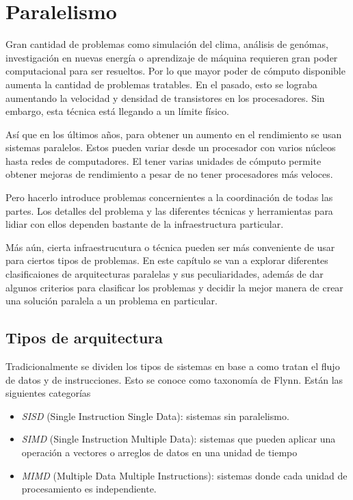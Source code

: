 \chapter{Paralelismo}

Gran cantidad de problemas como simulación del clima, análisis de genómas,
investigación en nuevas energía o aprendizaje de máquina \cite{Pacheco2011}
requieren gran poder computacional para ser resueltos. Por lo que mayor poder
de cómputo disponible aumenta la cantidad de problemas tratables. En el pasado,
esto se lograba aumentando la velocidad y densidad de transistores en los
procesadores. Sin embargo, esta técnica está llegando a un límite físico.

Así que en los últimos años, para obtener un aumento en el rendimiento se usan
sistemas paralelos. Estos pueden variar desde un procesador con varios núcleos
hasta redes de computadores. El tener varias unidades de cómputo permite obtener
mejoras de rendimiento a pesar de no tener procesadores más veloces.

Pero hacerlo introduce problemas concernientes a la coordinación de todas las
partes. Los detalles del problema y las diferentes técnicas y herramientas para
lidiar con ellos dependen bastante de la infraestructura particular.

Más aún, cierta infraestrucutura o técnica pueden ser más conveniente de usar
para ciertos tipos de problemas. En este capítulo se van a explorar diferentes
clasificaiones de arquitecturas paralelas y sus peculiaridades, además de dar
algunos criterios para clasificar los problemas y decidir la mejor manera de
crear una solución paralela a un problema en particular.

\section{Tipos de arquitectura}

Tradicionalmente se dividen los tipos de sistemas en base a como tratan el flujo
de datos y de instrucciones. Esto se conoce como taxonomía de Flynn. Están las
siguientes  categorías

\begin{itemize}
  \item \textit{SISD} (Single Instruction Single Data): sistemas
    sin paralelismo.

  \item \textit{SIMD} (Single Instruction Multiple Data):
    sistemas que pueden aplicar una operación a vectores o arreglos de datos en
    una unidad de tiempo

  \item \textit{MIMD} (Multiple Data Multiple Instructions):
    sistemas donde cada unidad de procesamiento es independiente.
\end{itemize}

